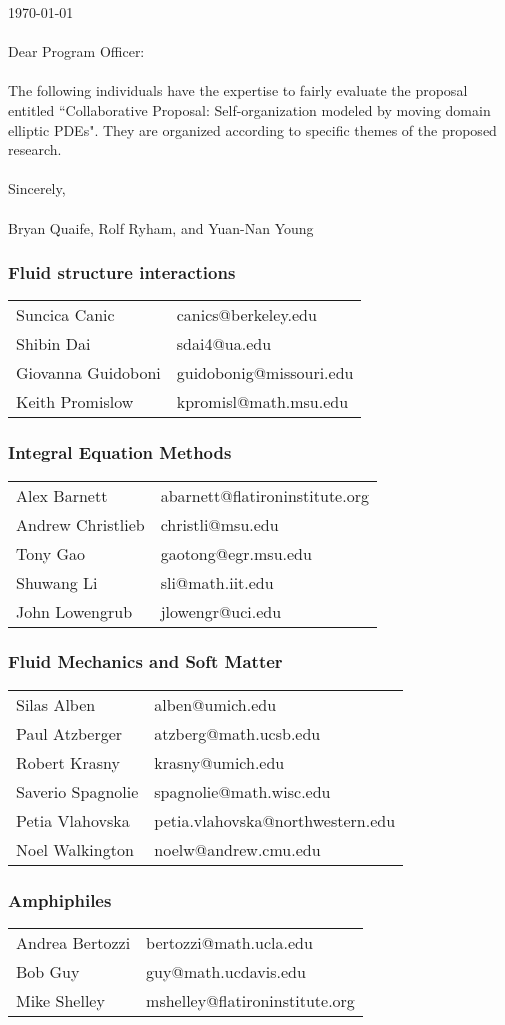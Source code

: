 \documentclass[11pt]{article}
\begin{document}
\sloppy

\noindent
\today \\ \\
Dear Program Officer:
\\ \\
\noindent
The following individuals have the expertise to fairly evaluate the 
proposal entitled ``Collaborative Proposal: Self-organization modeled by
moving domain elliptic PDEs". They are organized according to specific
themes of the proposed research.
\\ \\
Sincerely, \\ \\
Bryan Quaife, Rolf Ryham, and Yuan-Nan Young \\

\subsubsection*{Fluid structure interactions}
\begin{tabular}{ll}
  Suncica Canic & canics@berkeley.edu \\
  Shibin Dai & sdai4@ua.edu \\
  Giovanna Guidoboni \qquad & guidobonig@missouri.edu \\
  Keith Promislow & kpromisl@math.msu.edu
\end{tabular}


\subsubsection*{Integral Equation Methods}
\begin{tabular}{ll}
  Alex Barnett & abarnett@flatironinstitute.org \\
  Andrew Christlieb \qquad &christli@msu.edu \\
  Tony Gao & gaotong@egr.msu.edu \\
  Shuwang Li & sli@math.iit.edu \\
  John Lowengrub & jlowengr@uci.edu
\end{tabular}


\subsubsection*{Fluid Mechanics and Soft Matter}
\begin{tabular}{ll}
Silas Alben & alben@umich.edu \\
  Paul Atzberger & atzberg@math.ucsb.edu \\
Robert Krasny & krasny@umich.edu \\
Saverio Spagnolie \qquad & spagnolie@math.wisc.edu \\
Petia Vlahovska & petia.vlahovska@northwestern.edu \\
Noel Walkington & noelw@andrew.cmu.edu 
\end{tabular}


\subsubsection*{Amphiphiles}
\begin{tabular}{ll}
Andrea Bertozzi & bertozzi@math.ucla.edu \\
Bob Guy & guy@math.ucdavis.edu \\
Mike Shelley & mshelley@flatironinstitute.org 
\end{tabular}
\end{document}

